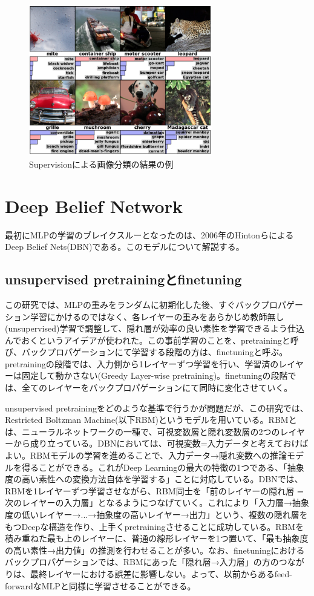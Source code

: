 \begin{figure}[tbp]
 \begin{center}
  \includegraphics[width=80mm]{img/c3/supervision}
 \end{center}
 \caption{Supervisionによる画像分類の結果の例}
 \label{c3_supervision}
\end{figure}
\section{Deep Belief Network}
最初にMLPの学習のブレイクスルーとなったのは、2006年のHintonらによるDeep Belief Nets(DBN)\cite{hinton2006a-fast, hinton2006reducing}である。このモデルについて解説する。
\subsection{unsupervised pretrainingとfinetuning}
この研究では、MLPの重みをランダムに初期化した後、すぐバックプロパゲーション学習にかけるのではなく、各レイヤーの重みをあらかじめ教師無し(unsupervised)学習で調整して、隠れ層が効率の良い素性を学習できるよう仕込んでおくというアイデアが使われた。この事前学習のことを、pretrainingと呼び、バックプロパゲーションにて学習する段階の方は、finetuningと呼ぶ。pretrainingの段階では、入力側から1レイヤーずつ学習を行い、学習済のレイヤーは固定して動かさない(Greedy Layer-wise pretraining)。finetuningの段階では、全てのレイヤーをバックプロパゲーションにて同時に変化させていく。\par
unsupervised pretrainingをどのような基準で行うかが問題だが、この研究では、Restricted Boltzman Machine(以下RBM)というモデルを用いている。RBMとは、ニューラルネットワークの一種で、可視変数層と隠れ変数層の2つのレイヤーから成り立っている。DBNにおいては、可視変数=入力データと考えておけばよい。RBMモデルの学習を進めることで、入力データ→隠れ変数への推論モデルを得ることができる。これがDeep Learningの最大の特徴の1つである、「抽象度の高い素性への変換方法自体を学習する」ことに対応している。DBNでは、RBMを1レイヤーずつ学習させながら、RBM同士を「前のレイヤーの隠れ層 = 次のレイヤーの入力層」となるようにつなげていく。これにより「入力層→抽象度の低いレイヤー→...→抽象度の高いレイヤー→出力」という、複数の隠れ層をもつDeepな構造を作り、上手くpretrainingさせることに成功している。RBMを積み重ねた最も上のレイヤーに、普通の線形レイヤーを1つ置いて、「最も抽象度の高い素性→出力値」の推測を行わせることが多い。なお、finetuningにおけるバックプロパゲーションでは、RBMにあった「隠れ層→入力層」の方のつながりは、最終レイヤーにおける誤差に影響しない。よって、以前からあるfeed-forwardなMLPと同様に学習させることができる。
